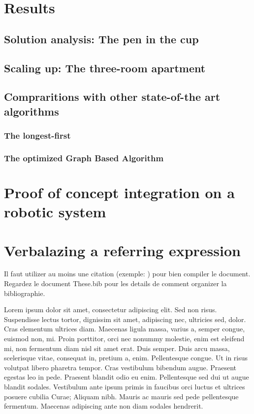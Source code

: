 \section{Results}

\subsection{Solution analysis: The pen in the cup}

\subsection{Scaling up: The three-room apartment}

\subsection{Compraritions with other state-of-the art algorithms}

\subsubsection{The longest-first}

\subsubsection{The optimized Graph Based Algorithm}

\section{Proof of concept integration on a robotic system}

\section{Verbalazing a referring expression}

Il faut utilizer au moins une citation (exemple: \cite{goossens93}) pour bien
compiler le document. Regardez le document These.bib pour les details de
comment organizer la bibliographie.


Lorem ipsum dolor sit amet, consectetur adipiscing elit. Sed non risus. Suspendisse lectus tortor, dignissim sit amet, adipiscing nec, ultricies sed, dolor. Cras elementum ultrices diam. Maecenas ligula massa, varius a, semper congue, euismod non, mi. Proin porttitor, orci nec nonummy molestie, enim est eleifend mi, non fermentum diam nisl sit amet erat. Duis semper. Duis arcu massa, scelerisque vitae, consequat in, pretium a, enim. Pellentesque congue. Ut in risus volutpat libero pharetra tempor. Cras vestibulum bibendum augue. Praesent egestas leo in pede. Praesent blandit odio eu enim. Pellentesque sed dui ut augue blandit sodales. Vestibulum ante ipsum primis in faucibus orci luctus et ultrices posuere cubilia Curae; Aliquam nibh. Mauris ac mauris sed pede pellentesque fermentum. Maecenas adipiscing ante non diam sodales hendrerit.

